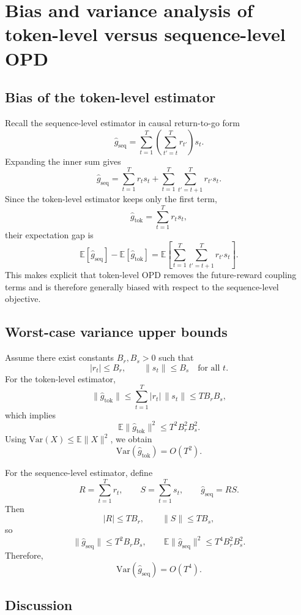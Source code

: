 \documentclass{article}
\begin{document}
\section{Bias and variance analysis of token-level versus sequence-level OPD}
\label{app:bias_variance}

\subsection{Bias of the token-level estimator}

Recall the sequence-level estimator in causal return-to-go form
\[
\hat g_{\mathrm{seq}} = \sum_{t=1}^{T} \left(\sum_{t'=t}^{T} r_{t'}\right) s_t.
\]
Expanding the inner sum gives
\[
\hat g_{\mathrm{seq}}
=
\sum_{t=1}^{T} r_t s_t
+
\sum_{t=1}^{T}
\sum_{t'=t+1}^{T}
r_{t'} s_t.
\]
Since the token-level estimator keeps only the first term,
\[
\hat g_{\mathrm{tok}} = \sum_{t=1}^{T} r_t s_t,
\]
their expectation gap is
\[
\mathbb{E}[\hat g_{\mathrm{seq}}] - \mathbb{E}[\hat g_{\mathrm{tok}}]
=
\mathbb{E}\left[
\sum_{t=1}^{T}
\sum_{t'=t+1}^{T}
r_{t'} s_t
\right].
\]
This makes explicit that token-level OPD removes the future-reward coupling terms and is therefore generally biased with respect to the sequence-level objective.

\subsection{Worst-case variance upper bounds}

Assume there exist constants $B_r, B_s > 0$ such that
\[
|r_t| \le B_r,
\qquad
\|s_t\| \le B_s
\quad \text{for all } t.
\]
For the token-level estimator,
\[
\|\hat g_{\mathrm{tok}}\|
\le
\sum_{t=1}^{T} |r_t| \, \|s_t\|
\le
T B_r B_s,
\]
which implies
\[
\mathbb{E}\|\hat g_{\mathrm{tok}}\|^2 \le T^2 B_r^2 B_s^2.
\]
Using $\mathrm{Var}(X) \le \mathbb{E}\|X\|^2$, we obtain
\[
\mathrm{Var}(\hat g_{\mathrm{tok}}) = O(T^2).
\]

For the sequence-level estimator, define
\[
R = \sum_{t=1}^{T} r_t,
\qquad
S = \sum_{t=1}^{T} s_t,
\qquad
\hat g_{\mathrm{seq}} = RS.
\]
Then
\[
|R| \le T B_r,
\qquad
\|S\| \le T B_s,
\]
so
\[
\|\hat g_{\mathrm{seq}}\|
\le
T^2 B_r B_s,
\qquad
\mathbb{E}\|\hat g_{\mathrm{seq}}\|^2 \le T^4 B_r^2 B_s^2.
\]
Therefore,
\[
\mathrm{Var}(\hat g_{\mathrm{seq}}) = O(T^4).
\]

\subsection{Discussion}
\end{document}
